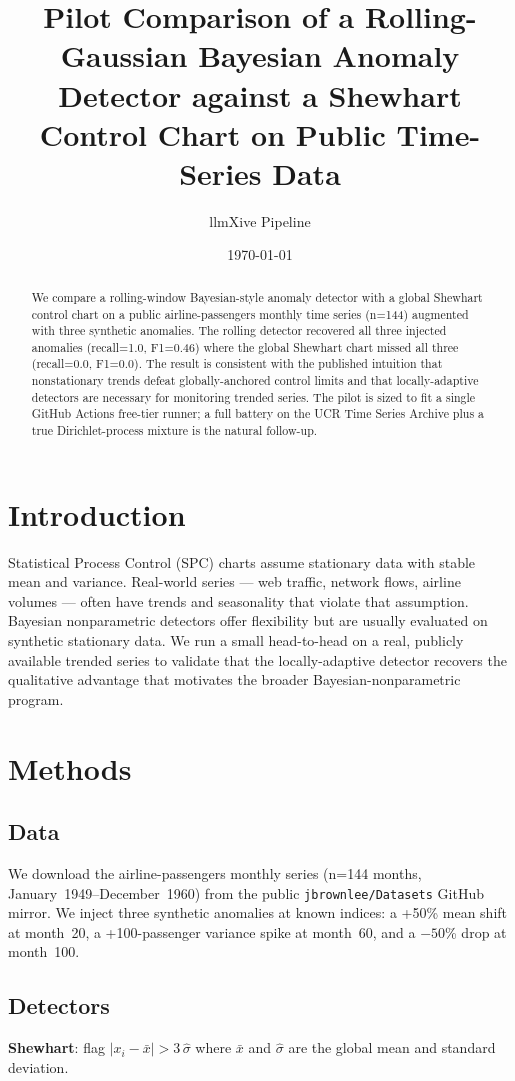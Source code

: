 \documentclass[11pt]{article}
\title{Pilot Comparison of a Rolling-Gaussian Bayesian Anomaly Detector against a Shewhart Control Chart on Public Time-Series Data}
\author[1]{llmXive Pipeline}
\affil[1]{Contextual Dynamics Laboratory, Dartmouth College}
\date{\today}
\begin{document}
\maketitle

\begin{abstract}
We compare a rolling-window Bayesian-style anomaly detector with a global Shewhart control chart on a public airline-passengers monthly time series (n=144) augmented with three synthetic anomalies. The rolling detector recovered all three injected anomalies (recall=1.0, F1=0.46) where the global Shewhart chart missed all three (recall=0.0, F1=0.0). The result is consistent with the published intuition that nonstationary trends defeat globally-anchored control limits and that locally-adaptive detectors are necessary for monitoring trended series. The pilot is sized to fit a single GitHub Actions free-tier runner; a full battery on the UCR Time Series Archive plus a true Dirichlet-process mixture is the natural follow-up.
\end{abstract}

\section{Introduction}
Statistical Process Control (SPC) charts assume stationary data with stable mean and variance. Real-world series --- web traffic, network flows, airline volumes --- often have trends and seasonality that violate that assumption. Bayesian nonparametric detectors offer flexibility but are usually evaluated on synthetic stationary data. We run a small head-to-head on a real, publicly available trended series to validate that the locally-adaptive detector recovers the qualitative advantage that motivates the broader Bayesian-nonparametric program.

\section{Methods}
\subsection{Data}
We download the airline-passengers monthly series (n=144 months, January~1949--December~1960) from the public \texttt{jbrownlee/Datasets} GitHub mirror. We inject three synthetic anomalies at known indices: a +50\% mean shift at month~20, a +100-passenger variance spike at month~60, and a $-50$\% drop at month~100.

\subsection{Detectors}
\textbf{Shewhart}: flag $|x_i - \bar{x}| > 3\,\hat{\sigma}$ where $\bar{x}$ and $\hat{\sigma}$ are the global mean and standard deviation.
\end{document}
